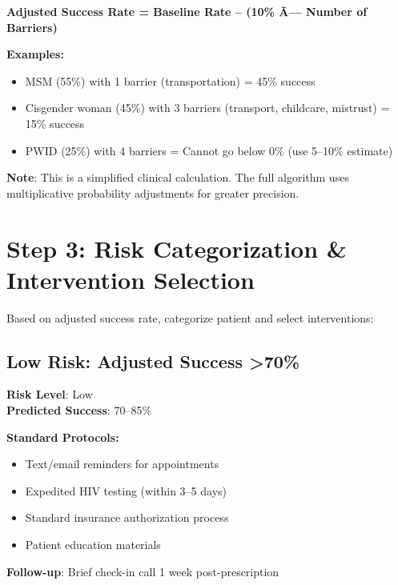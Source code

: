 \documentclass[11pt]{article}
\begin{document}
\begin{tcolorbox}[colback=blue!10!white,colframe=blue!75!black,title=\textbf{Calculation Formula}]
\textbf{Adjusted Success Rate = Baseline Rate -- (10\% Ã— Number of Barriers)}

\textbf{Examples:}
\begin{itemize}
\item MSM (55\%) with 1 barrier (transportation) = 45\% success
\item Cisgender woman (45\%) with 3 barriers (transport, childcare, mistrust) = 15\% success
\item PWID (25\%) with 4 barriers = Cannot go below 0\% (use 5--10\% estimate)
\end{itemize}

\textbf{Note}: This is a simplified clinical calculation. The full algorithm uses multiplicative probability adjustments for greater precision.
\end{tcolorbox}

\section{Step 3: Risk Categorization \& Intervention Selection}

Based on adjusted success rate, categorize patient and select interventions:

\subsection{Low Risk: Adjusted Success >70\%}

\begin{tcolorbox}[colback=green!10!white,colframe=green!75!black,breakable]
\textbf{Risk Level}: Low \\
\textbf{Predicted Success}: 70--85\%

\textbf{Standard Protocols:}
\begin{itemize}[leftmargin=*]
\item Text/email reminders for appointments
\item Expedited HIV testing (within 3--5 days)
\item Standard insurance authorization process
\item Patient education materials
\end{itemize}

\textbf{Follow-up}: Brief check-in call 1 week post-prescription
\end{tcolorbox}
\end{document}
